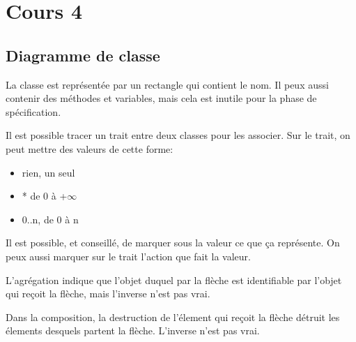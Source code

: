 \section{Cours 4}

\subsection{Diagramme de classe}
La classe est représentée par un rectangle qui contient le nom.
Il peux aussi contenir des méthodes et variables, mais cela est inutile pour la phase de spécification.

Il est possible tracer un trait entre deux classes pour les associer.
Sur le trait, on peut mettre des valeurs de cette forme:
\begin{itemize}
	\item rien, un seul
	\item * de 0 à +$\infty$
	\item 0..n, de 0 à n
\end{itemize}
Il est possible, et conseillé, de marquer sous la valeur ce que ça représente.
On peux aussi marquer sur le trait l'action que fait la valeur.

L'agrégation indique que l'objet duquel par la flèche est identifiable par l'objet qui reçoit la flèche, mais
l'inverse n'est pas vrai.

Dans la composition, la destruction de l'élement qui reçoit la flèche détruit les élements desquels partent la
flèche. L'inverse n'est pas vrai.
